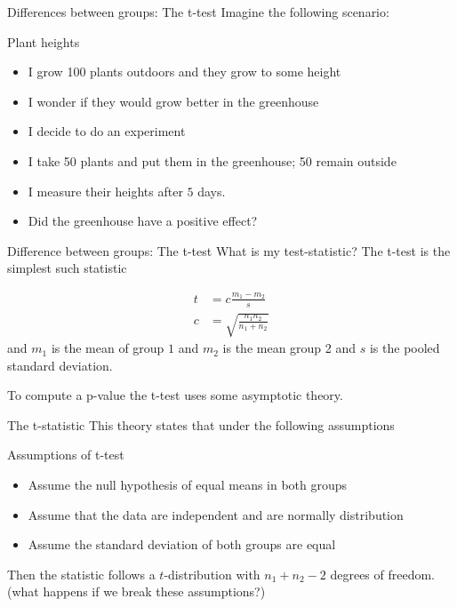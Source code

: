 \documentclass{bredelebeamer}
\begin{document}
\begin{frame}{Differences between groups: The t-test}
Imagine the following scenario:
\begin{block}{Plant heights}
	\begin{itemize}
		\item I grow 100 plants outdoors and they grow to some height
		\item I wonder if they would grow better in the greenhouse
		\item I decide to do an experiment
		\item I take 50 plants and put them in the greenhouse; 50 remain outside
		\item I measure their heights after $5$ days.
		\item Did the greenhouse have a positive effect?
	\end{itemize}

\end{block}
\end{frame}

\begin{frame}{Difference between groups: The t-test}
What is my test-statistic? The t-test is the simplest such statistic

\begin{align}
t &= c\frac{m_1 - m_2}{s} \\
c & = \sqrt{\frac{n_1 n_2}{n_1 + n_2}}
\end{align}
and $m_1$ is the mean of group $1$ and $m_2$ is the mean group 2 and $s$ is the pooled standard deviation.

To compute a p-value the t-test uses some asymptotic theory.  
\end{frame}


\begin{frame}{The t-statistic}
This theory states that under the following assumptions
\begin{block}{Assumptions of t-test}

\begin{itemize}
	\item Assume the null hypothesis of equal means in both groups
\item Assume that the data are independent and are normally distribution
\item Assume the standard deviation of both groups are equal
\end{itemize}

\end{block}
Then the statistic follows a $t$-distribution with $n_1 + n_2 - 2$ degrees of freedom.
\\
(what happens if we break these assumptions?)
\end{frame}
\end{document}
